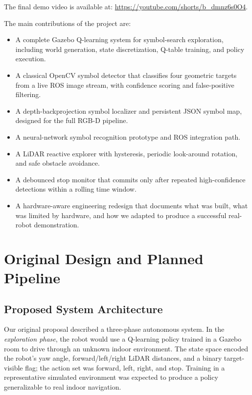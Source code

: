 \documentclass[letterpaper, 10 pt, conference]{ieeeconf/ieeeconf}
\begin{document}
The final demo video is available at:
\url{https://youtube.com/shorts/b_dmnz6s0O4}.

The main contributions of the project are:
\begin{itemize}
  \item A complete Gazebo Q-learning system for symbol-search exploration,
        including world generation, state discretization, Q-table training,
        and policy execution.
  \item A classical OpenCV symbol detector that classifies four geometric
        targets from a live ROS image stream, with confidence scoring and
        false-positive filtering.
  \item A depth-backprojection symbol localizer and persistent JSON symbol
        map, designed for the full RGB-D pipeline.
  \item A neural-network symbol recognition prototype and ROS integration path.
  \item A LiDAR reactive explorer with hysteresis, periodic look-around
        rotation, and safe obstacle avoidance.
  \item A debounced stop monitor that commits only after repeated
        high-confidence detections within a rolling time window.
  \item A hardware-aware engineering redesign that documents what was built,
        what was limited by hardware, and how we adapted to produce a successful
        real-robot demonstration.
\end{itemize}

\section{Original Design and Planned Pipeline}
\label{sec:original-design}

\subsection{Proposed System Architecture}

Our original proposal described a three-phase autonomous system.
In the \emph{exploration phase}, the robot would use a Q-learning policy
trained in a Gazebo room to drive through an unknown indoor environment.
The state space encoded the robot's yaw angle, forward/left/right LiDAR
distances, and a binary target-visible flag; the action set was forward, left,
right, and stop.
Training in a representative simulated environment was expected to produce
a policy generalizable to real indoor navigation.
\end{document}
